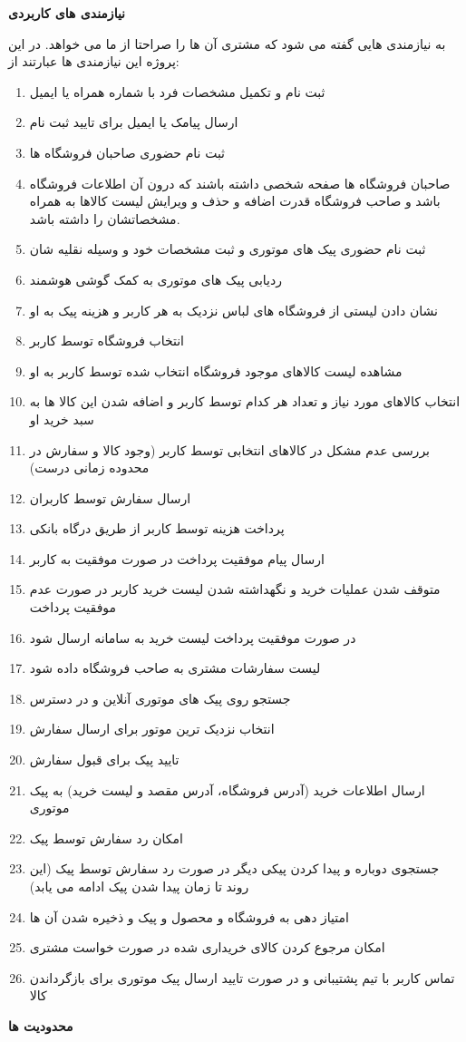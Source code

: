 \documentclass[12pt,a4paper]{article}
\begin{document}
	\textbf{نیازمندی های کاربردی} 
	
	
	به نیازمندی هایی گفته می شود که مشتری آن ها را صراحتا از ما می خواهد. در این پروژه این نیازمندی ها عبارتند از:
\begin{enumerate}
	\item
	ثبت نام و تکمیل مشخصات فرد با شماره همراه یا ایمیل
	\item
	ارسال پیامک یا ایمیل برای تایید ثبت نام
	\item
	ثبت نام حضوری صاحبان فروشگاه ها
	\item
	صاحبان فروشگاه ها صفحه شخصی داشته باشند که درون آن اطلاعات فروشگاه باشد و صاحب فروشگاه قدرت اضافه و حذف و ویرایش لیست کالاها به همراه مشخصاتشان را داشته باشد.
	\item
	ثبت نام حضوری پیک های موتوری و ثبت مشخصات خود و وسیله نقلیه شان
\item
ردیابی پیک های موتوری به کمک گوشی هوشمند
\item
نشان دادن لیستی از فروشگاه های لباس نزدیک به هر کاربر و هزینه پیک به او
\item
انتخاب فروشگاه توسط کاربر
\item
مشاهده لیست کالاهای موجود فروشگاه انتخاب شده توسط کاربر به او
\item
انتخاب کالاهای مورد نیاز و تعداد هر کدام توسط کاربر و اضافه شدن این کالا ها به سبد خرید او
\item
بررسی عدم مشکل در کالاهای انتخابی توسط کاربر (وجود کالا و سفارش در محدوده زمانی درست)
\item
ارسال سفارش توسط کاربران
\item
پرداخت هزینه توسط کاربر از طریق درگاه بانکی
\item
ارسال پیام موفقیت پرداخت در صورت موفقیت به کاربر
\item
متوقف شدن عملیات خرید و نگهداشته شدن لیست خرید کاربر در صورت عدم موفقیت پرداخت
\item
در صورت موفقیت پرداخت لیست خرید به سامانه ارسال شود
\item
لیست سفارشات مشتری به صاحب فروشگاه داده شود
\item
جستجو روی پیک های موتوری آنلاین و در دسترس 
\item
انتخاب نزدیک ترین موتور برای ارسال سفارش
\item
تایید پیک برای قبول سفارش
\item
ارسال اطلاعات خرید (آدرس فروشگاه، آدرس مقصد و لیست خرید) به پیک موتوری
\item
	امکان رد سفارش توسط پیک
\item
جستجوی دوباره و پیدا کردن پیکی دیگر در صورت رد سفارش توسط پیک (این روند تا زمان پیدا شدن پیک ادامه می یابد)
\item
امتیاز دهی به فروشگاه و محصول و پیک و ذخیره شدن آن ها
\item
امکان مرجوع کردن کالای خریداری شده در صورت خواست مشتری
\item
تماس کاربر با تیم پشتیبانی و در صورت تایید ارسال پیک موتوری برای بازگرداندن کالا
	
\end{enumerate}
\pagebreak
\textbf{	محدودیت ها }
\end{document}
